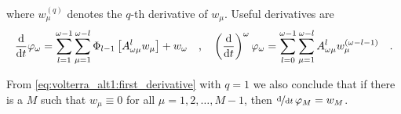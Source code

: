 where $w_\mu^{(q)}$ denotes the $q$-th derivative of $w_\mu$. Useful derivatives are
\begin{equation}
\frac{\text{d}}{\text{d} t} \varphi_\omega = \sum\limits_{l=1}^{\omega-1} 
\sum\limits_{\mu=1}^{\omega-l} \Phi_{l-1}\left[A^l_{\omega\mu} w_\mu \right]
+ w_\omega
\quad \text{,} \quad
\left( \frac{\text{d}}{\text{d} t}\right)^\omega \varphi_\omega= 
\sum\limits_{l=0}^{\omega-1} \sum\limits_{\mu=1}^{\omega-l} A^l_{\omega\mu} 
w_\mu^{(\omega-l-1)} \quad .
\end{equation}
\begin{corollary}\label{corollary:volterra_alt1:M}
From \eqref{eq:volterra_alt1:first_derivative} with $q=1$ we also conclude that if there 
is a $M$ 
such that $w_\mu \equiv 0$ for all $\mu=1,2,\ldots,M-1$, then $\nicefrac{\text{d}}{\text{d} t}
\, \varphi_M = w_M$.
\end{corollary}

